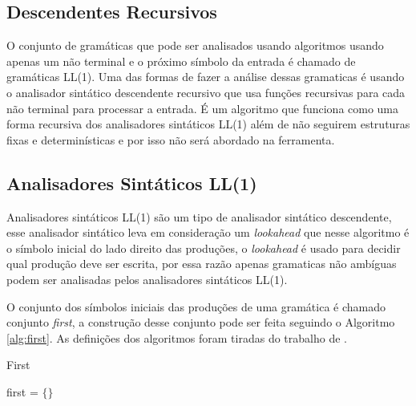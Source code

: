 \subsection{Descendentes Recursivos}
O conjunto de gramáticas que pode ser analisados usando algoritmos usando apenas um não terminal e o próximo símbolo da entrada é chamado de gramáticas LL(1). Uma das formas de fazer a análise dessas gramaticas é usando o analisador sintático descendente recursivo que usa funções recursivas para cada não terminal para processar a entrada. É um algoritmo que funciona como uma forma recursiva dos analisadores sintáticos LL(1) além de não seguirem estruturas fixas e determinísticas e por isso não será abordado na ferramenta.

\subsection{Analisadores Sintáticos LL(1)} 
Analisadores sintáticos LL(1) são um tipo de analisador sintático descendente, esse analisador sintático leva em consideração um \textit{lookahead} que nesse algoritmo é o símbolo inicial do lado direito das produções, o \textit{lookahead} é usado para decidir qual produção deve ser escrita, por essa razão apenas gramaticas não ambíguas podem ser analisadas pelos analisadores sintáticos LL(1).

O conjunto dos símbolos iniciais das produções de uma gramática é chamado conjunto \textit{first}, a construção desse conjunto pode ser feita seguindo o Algoritmo \ref{alg:first}. As definições dos algoritmos foram tiradas do trabalho de \textcite{thain2020introduction}.


\begin{algorithm}[htp]
    \caption{First}\label{alg:first}
    first = $\{\}$\\
\end{algorithm}


